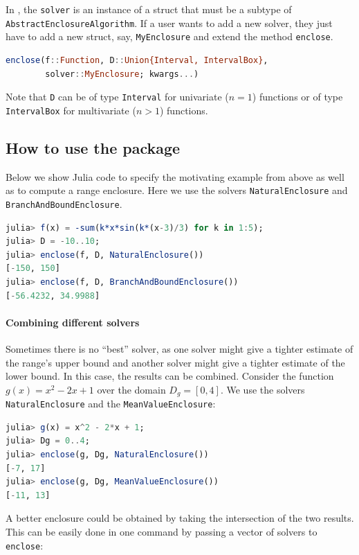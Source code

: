 \documentclass{juliacon}
\begin{document}
In \emph{\RE}, the \texttt{solver} is an instance of a struct that must be a subtype of \texttt{AbstractEnclosureAlgorithm}.
If a user wants to add a new solver, they just have to add a new struct, say, \texttt{MyEnclosure} and extend the method \texttt{enclose}.
%
\begin{lstlisting}[language=Julia]
enclose(f::Function, D::Union{Interval, IntervalBox},
        solver::MyEnclosure; kwargs...)
\end{lstlisting}

Note that \texttt{D} can be of type \texttt{Interval} for univariate ($n = 1$) functions or of type \texttt{IntervalBox} for multivariate ($n > 1$) functions.


\subsection{How to use the package}

Below we show Julia code to specify the motivating example from above as well as to compute a range enclosure. Here we use the solvers \texttt{NaturalEnclosure} and \texttt{BranchAndBoundEnclosure}.

\begin{lstlisting}[language=Julia]
julia> f(x) = -sum(k*x*sin(k*(x-3)/3) for k in 1:5);
julia> D = -10..10;
julia> enclose(f, D, NaturalEnclosure())
[-150, 150]
julia> enclose(f, D, BranchAndBoundEnclosure())
[-56.4232, 34.9988]
\end{lstlisting}


\paragraph*{Combining different solvers}

Sometimes there is no ``best'' solver, as one solver might give a tighter estimate of the range's upper bound and another solver might give a tighter estimate of the lower bound. In this case, the results can be combined. Consider the function $g(x) = x^2 - 2x + 1$ over the domain $D_g = [0, 4]$. We use the solvers \texttt{NaturalEnclosure} and the \texttt{MeanValueEnclosure}:

\begin{lstlisting}[language=Julia]
julia> g(x) = x^2 - 2*x + 1;
julia> Dg = 0..4;
julia> enclose(g, Dg, NaturalEnclosure())
[-7, 17]
julia> enclose(g, Dg, MeanValueEnclosure())
[-11, 13]
\end{lstlisting}

A better enclosure could be obtained by taking the intersection of the two results. This can be easily done in one command by passing a vector of solvers to \texttt{enclose}:
\end{document}
